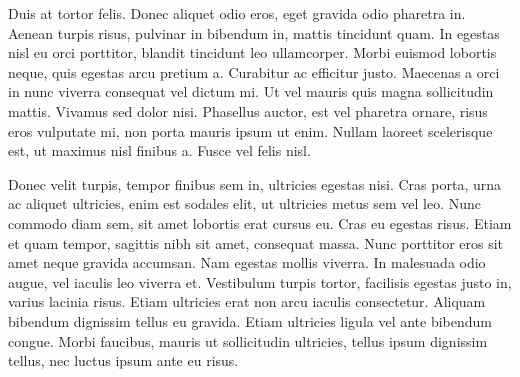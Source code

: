 \documentclass[
    a4paper, %
    12pt, %
    stu, %
    noextraspace, %
    floatsintext, %
    biblatex, %
    twoside %
    colorlinks=true,        %
    linkcolor=black,          %
    anchorcolor=black,      %
    citecolor=black,         %
    urlcolor=black,          %
    bookmarks=true,         %
    bookmarksopen=false,    %
    bookmarksnumbered=true,  %
    dvipsnames
]{apa7}
\begin{document}
Duis at tortor felis. Donec aliquet odio eros, eget gravida odio pharetra in. Aenean turpis risus, pulvinar in bibendum in, mattis tincidunt quam. In egestas nisl eu orci porttitor, blandit tincidunt leo ullamcorper. Morbi euismod lobortis neque, quis egestas arcu pretium a. Curabitur ac efficitur justo. Maecenas a orci in nunc viverra consequat vel dictum mi. Ut vel mauris quis magna sollicitudin mattis. Vivamus sed dolor nisi. Phasellus auctor, est vel pharetra ornare, risus eros vulputate mi, non porta mauris ipsum ut enim. Nullam laoreet scelerisque est, ut maximus nisl finibus a. Fusce vel felis nisl.

Donec velit turpis, tempor finibus sem in, ultricies egestas nisi. Cras porta, urna ac aliquet ultricies, enim est sodales elit, ut ultricies metus sem vel leo. Nunc commodo diam sem, sit amet lobortis erat cursus eu. Cras eu egestas risus. Etiam et quam tempor, sagittis nibh sit amet, consequat massa. Nunc porttitor eros sit amet neque gravida accumsan. Nam egestas mollis viverra. In malesuada odio augue, vel iaculis leo viverra et. Vestibulum turpis tortor, facilisis egestas justo in, varius lacinia risus. Etiam ultricies erat non arcu iaculis consectetur. Aliquam bibendum dignissim tellus eu gravida. Etiam ultricies ligula vel ante bibendum congue. Morbi faucibus, mauris ut sollicitudin ultricies, tellus ipsum dignissim tellus, nec luctus ipsum ante eu risus.
\end{document}
